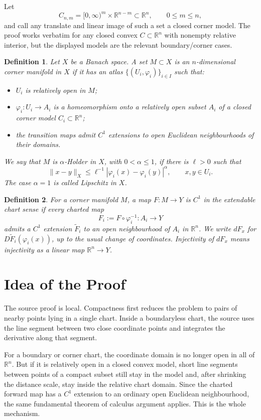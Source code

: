 \documentclass[11pt]{article}
\newtheorem{definition}{Definition}
\newcommand{\R}{\mathbb R}
\begin{document}
Let
\[
  C_{n,m}=[0,\infty)^m\times \R^{n-m}\subset\R^n,
  \qquad 0\le m\le n,
\]
and call any translate and linear image of such a set a closed corner model.  The proof works verbatim for any closed convex \(C\subset\R^n\) with nonempty relative interior, but the displayed models are the relevant boundary/corner cases.

\begin{definition}
Let \(X\) be a Banach space.  A set \(M\subset X\) is an \(n\)-dimensional corner manifold in \(X\) if it has an atlas \(\{(U_i,\varphi_i)\}_{i\in I}\) such that:
\begin{itemize}
\item \(U_i\) is relatively open in \(M\);
\item \(\varphi_i:U_i\to A_i\) is a homeomorphism onto a relatively open subset \(A_i\) of a closed corner model \(C_i\subset\R^n\);
\item the transition maps admit \(C^1\) extensions to open Euclidean neighbourhoods of their domains.
\end{itemize}
We say that \(M\) is \(\alpha\)-Holder in \(X\), with \(0<\alpha\le1\), if there is \(\ell>0\) such that
\[
  \|x-y\|_X\le \ell^{-1}|\varphi_i(x)-\varphi_i(y)|^\alpha,
  \qquad x,y\in U_i.
\]
The case \(\alpha=1\) is called Lipschitz in \(X\).
\end{definition}

\begin{definition}
For a corner manifold \(M\), a map \(F:M\to Y\) is \(C^1\) in the extendable chart sense if every charted map
\[
  F_i:=F\circ\varphi_i^{-1}:A_i\to Y
\]
admits a \(C^1\) extension \(\widetilde F_i\) to an open neighbourhood of \(A_i\) in \(\R^n\).  We write \(dF_x\) for \(D\widetilde F_i(\varphi_i(x))\), up to the usual change of coordinates.  Injectivity of \(dF_x\) means injectivity as a linear map \(\R^n\to Y\).
\end{definition}

\section{Idea of the Proof}

The source proof is local.  Compactness first reduces the problem to pairs of nearby points lying in a single chart.  Inside a boundaryless chart, the source uses the line segment between two close coordinate points and integrates the derivative along that segment.

For a boundary or corner chart, the coordinate domain is no longer open in all of \(\R^n\).  But if it is relatively open in a closed convex model, short line segments between points of a compact subset still stay in the model and, after shrinking the distance scale, stay inside the relative chart domain.  Since the charted forward map has a \(C^1\) extension to an ordinary open Euclidean neighbourhood, the same fundamental theorem of calculus argument applies.  This is the whole mechanism.
\end{document}
